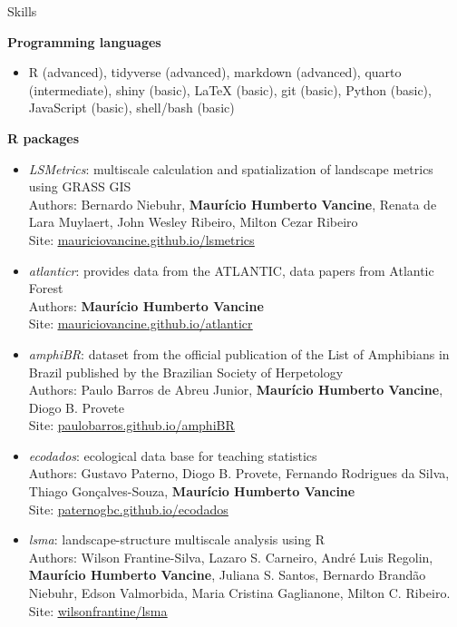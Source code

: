 \documentclass{resume}
\begin{document}
\begin{rSection}{Skills}

{\bf Programming languages}
\begin{itemize}
\item R (advanced), tidyverse (advanced), markdown (advanced), quarto (intermediate), shiny (basic), LaTeX (basic), git (basic), Python (basic), JavaScript (basic), shell/bash (basic)
\end{itemize}

{\bf R packages}
\begin{itemize} 
\item {\it LSMetrics}: multiscale calculation and spatialization of landscape metrics using GRASS GIS
\\ Authors: Bernardo Niebuhr, {\bf Maurício Humberto Vancine}, Renata de Lara Muylaert, John Wesley Ribeiro, Milton Cezar Ribeiro
\\ Site: \href{https://mauriciovancine.github.io/lsmetrics}{\underline{mauriciovancine.github.io/lsmetrics}}

\item {\it atlanticr}: provides data from the ATLANTIC, data papers from Atlantic Forest
\\ Authors: {\bf Maurício Humberto Vancine}
\\ Site: \href{https://mauriciovancine.github.io/atlanticr}{\underline{mauriciovancine.github.io/atlanticr}}

\item {\it amphiBR}: dataset from the official publication of the List of Amphibians in Brazil published by the Brazilian Society of Herpetology
\\ Authors: Paulo Barros de Abreu Junior, {\bf Maurício Humberto Vancine}, Diogo B. Provete
\\ Site: \href{https://paulobarros.github.io/amphiBR}{\underline{paulobarros.github.io/amphiBR}}

\item {\it ecodados}: ecological data base for teaching statistics
\\ Authors: Gustavo Paterno, Diogo B. Provete, Fernando Rodrigues da Silva, Thiago Gonçalves-Souza, {\bf Maurício Humberto Vancine}
\\ Site: \href{https://paternogbc.github.io/ecodados/}{\underline{paternogbc.github.io/ecodados}}

\item {\it lsma}: landscape-structure multiscale analysis using R
\\ Authors: Wilson Frantine-Silva, Lazaro S. Carneiro, André Luis Regolin, {\bf Maurício Humberto Vancine}, Juliana S. Santos, Bernardo Brandão Niebuhr, Edson Valmorbida, Maria Cristina Gaglianone, Milton C. Ribeiro. 
\\ Site: \href{https://github.com/wilsonfrantine/landscapeDecoupler}{\underline{wilsonfrantine/lsma}}


\end{itemize}
\end{rSection}
\end{document}
